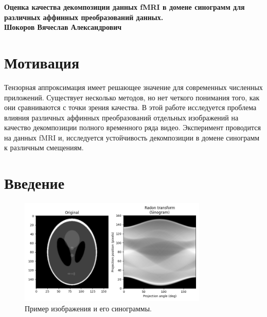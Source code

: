 \documentclass[14pt]{extarticle}
\begin{document}
\thispagestyle{empty}

\begin{center}
    \bf\Large
		Оценка качества декомпозиции данных fMRI в домене синограмм для различных аффинных преобразований данных. \\[10mm]
	\rm\large
        Шокоров Вячеслав Александрович\\[10mm]
\end{center}

\section{Мотивация}

Тензорная аппроксимация имеет решающее значение для современных численных приложений. Существует несколько методов, но нет четкого понимания того, как они сравниваются с точки зрения качества. В этой работе исследуется проблема влияния различных аффинных преобразований отдельных изображений на качество декомпозиции полного временного ряда видео. Эксперимент проводится на данных fMRI и, исследуется устойчивость декомпозиции в домене синограмм к различным смещениям.
 \\







\section{Введение}

\begin{figure}[h]
        \centering
        \includegraphics[width=0.8\textwidth]{orig-sinogram.png}
        
        \caption{Пример изображения и его синограммы.}
        \label{fig_1}
\end{figure}
\end{document}
